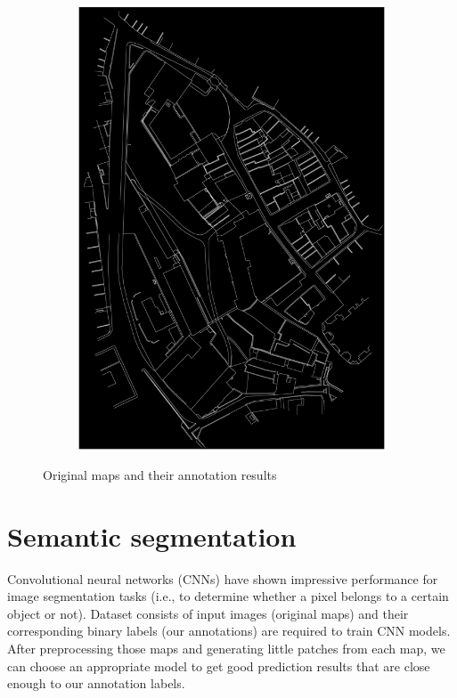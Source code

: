 \documentclass[12pt]{article}
\begin{document}
\begin{figure}[H]
\begin{subfigure}[b]{.5\textwidth}
		\includegraphics[width=1\linewidth]{images/label1.png}  
		\label{fig:sub-second}
	\end{subfigure}
	
	\caption{Original maps and their annotation results}
	\label{fig:whole-annotation}
\end{figure}



\section{Semantic segmentation}
Convolutional neural networks (CNNs)  have shown impressive performance for image segmentation tasks  (i.e.,  to determine whether a pixel belongs to a certain object or not)\cite{heitzler2020cartographic}. Dataset consists of input images (original maps) and their corresponding binary labels (our annotations) are required to train CNN models. After preprocessing those maps and generating little patches from each map, we can choose an appropriate model to get good prediction results that are close enough to our annotation labels. 
\end{document}
